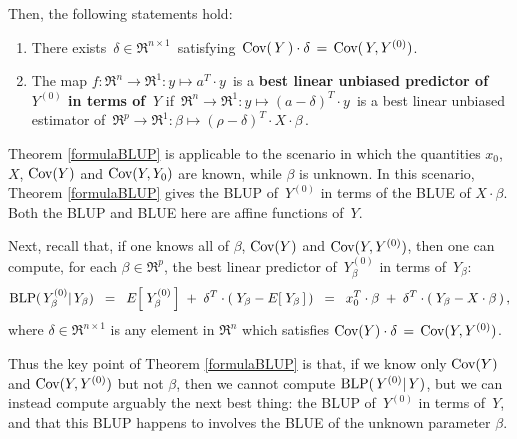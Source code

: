 \begin{theorem}
Then, the following statements hold:
\begin{enumerate}
\item
	There exists \,$\delta \in \Re^{n \times 1}$\, satisfying \,$\textnormal{Cov}(\,Y\,) \cdot \delta \,=\, \textnormal{Cov}(\,Y,Y^{(0)})$.
\item
	The map $f : \Re^{n} \longrightarrow \Re^{1} : y \longmapsto a^{T} \cdot y$\,
	is a \textbf{\color{red}best linear unbiased predictor of \,$Y^{(0)}$ in terms of \,$Y$} if
	\,$\Re^{n} \longrightarrow \Re^{1} : y \longmapsto (a - \delta)^{T} \cdot y$\,
	is a best linear unbiased estimator of 
	\,$\Re^{p} \longrightarrow \Re^{1} : \beta \longmapsto (\rho - \delta)^{T} \cdot X \cdot \beta$\,.
\end{enumerate}
\end{theorem}

\begin{remark}
\mbox{}
\vskip 0.05cm
\noindent
Theorem \ref{formulaBLUP} is applicable to the scenario in which
the quantities $x_{0}$, $X$, $\textnormal{Cov}(Y)$ and $\textnormal{Cov}(Y,Y_{0})$ are {\color{red}known}, while
{\color{red}$\beta$ is unknown}.
In this scenario, Theorem \ref{formulaBLUP} gives the BLUP of
\,$Y^{(0)}$ in terms of the BLUE of $X\cdot\beta$.
Both the BLUP and BLUE here are affine functions of \,$Y$.

Next, recall that, if one knows all of $\beta$, $\textnormal{Cov}(Y)$ and $\textnormal{Cov}(Y,Y^{(0)})$,
then one can compute, for each $\beta\in\Re^{p}$,
the {\color{red}best linear predictor of \,$Y^{(0)}_{\beta}$ in terms of \,$Y_{\beta}$}:
\begin{equation*}
\textnormal{BLP}(\,Y^{(0)}_{\beta}\vert\,Y_{\beta})
\;\; = \;\;
	E\!\left[\;Y^{(0)}_{\beta}\,\right] \; + \; \delta^{T}\cdot(\;Y_{\beta} - E\!\left[\;Y_{\beta}\,\right]\,)
\;\; = \;\;
	x_{0}^{T}\cdot\beta \; + \; \delta^{T}\cdot(\;Y_{\beta} - X\cdot\beta\,)\,,
\end{equation*}
where $\delta \in \Re^{n \times 1}$ is any element in $\Re^{n}$ which satisfies
$\textnormal{Cov}(Y) \cdot \delta \,=\, \textnormal{Cov}(Y,Y^{(0)})$.

Thus the key point of Theorem \ref{formulaBLUP} is that,
if we know only $\textnormal{Cov}(Y)$ and $\textnormal{Cov}(Y,Y^{(0)})$ but not $\beta$, then we cannot
compute $\textnormal{BLP}(\,Y^{(0)}\vert\,Y)$, but we can instead compute arguably the next best thing:
the BLUP of \,$Y^{(0)}$ in terms of \,$Y$, and that this BLUP happens to involves
the BLUE of the unknown parameter $\beta$.
\end{remark}

